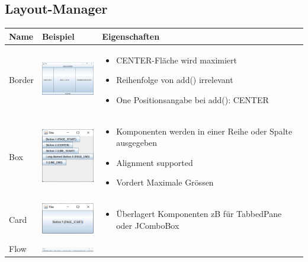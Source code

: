 \subsection{Layout-Manager}
\begin{tabular}{m{1cm} m{100px} m{4cm}}
	\textbf{Name} & \textbf{Beispiel} & \textbf{Eigenschaften} \\ \toprule
	Border & 	\includegraphics[width=100px]{Images/borderlayout} & \begin{itemize}[nosep]
		\item CENTER-Fläche wird maximiert
		\item Reihenfolge von add() irrelevant
		\item One Positionsangabe bei add(): CENTER
	\end{itemize} \\ \midrule
	Box & \includegraphics[width=100px]{Images/boxlayout} & \begin{itemize}[nosep]
		\item Komponenten werden in einer Reihe oder Spalte ausgegeben
		\item Alignment supported
		\item Vordert Maximale Grössen
	\end{itemize}  \\\midrule
	Card & \includegraphics[width=100px]{Images/cardlayout} & \begin{itemize}[nosep]
		\item Überlagert Komponenten zB für TabbedPane oder JComboBox
	\end{itemize} \\\midrule
	Flow & \includegraphics[width=100px]{Images/flowlayout} & \begin{itemize}[nosep]

\end{itemize}
\end{tabular}
